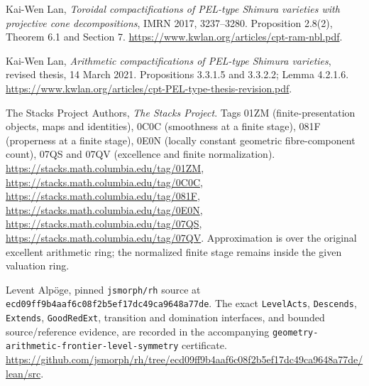 Kai-Wen Lan, \emph{Toroidal compactifications of PEL-type Shimura
varieties with projective cone decompositions}, IMRN 2017, 3237--3280.
Proposition 2.8(2), Theorem 6.1 and Section 7.
\url{https://www.kwlan.org/articles/cpt-ram-nbl.pdf}.

Kai-Wen Lan, \emph{Arithmetic compactifications of PEL-type Shimura
varieties}, revised thesis, 14 March 2021.
Propositions 3.3.1.5 and 3.3.2.2; Lemma 4.2.1.6.
\url{https://www.kwlan.org/articles/cpt-PEL-type-thesis-revision.pdf}.

The Stacks Project Authors, \emph{The Stacks Project}.
Tags 01ZM (finite-presentation objects, maps and identities),
0C0C (smoothness at a finite stage), 081F (properness at a finite
stage), 0E0N (locally constant geometric fibre-component count),
07QS and 07QV (excellence and finite normalization).
\url{https://stacks.math.columbia.edu/tag/01ZM},
\url{https://stacks.math.columbia.edu/tag/0C0C},
\url{https://stacks.math.columbia.edu/tag/081F},
\url{https://stacks.math.columbia.edu/tag/0E0N},
\url{https://stacks.math.columbia.edu/tag/07QS},
\url{https://stacks.math.columbia.edu/tag/07QV}.
Approximation is over the original excellent arithmetic ring;
the normalized finite stage remains inside the given valuation ring.

Levent Alp\"oge, pinned \texttt{jsmorph/rh} source at
\texttt{ecd09ff9b4aaf6c08f2b5ef17dc49ca9648a77de}.
The exact \texttt{LevelActs}, \texttt{Descends}, \texttt{Extends},
\texttt{GoodRedExt}, transition and domination interfaces, and
bounded source/reference evidence, are recorded in the accompanying
\texttt{geometry-arithmetic-frontier-level-symmetry} certificate.
\url{https://github.com/jsmorph/rh/tree/ecd09ff9b4aaf6c08f2b5ef17dc49ca9648a77de/lean/src}.
